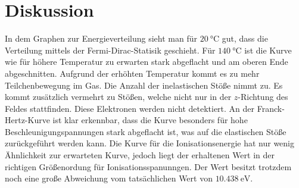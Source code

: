 \section{Diskussion}
\label{sec:Diskussion}
In dem Graphen zur Energieverteilung sieht man für $\SI{20}{\degreeCelsius}$ gut, dass die Verteilung mittels der Fermi-Dirac-Statisik geschieht.
Für $\SI{140}{\degreeCelsius}$ ist die Kurve wie für höhere Temperatur zu erwarten stark abgeflacht und am oberen Ende abgeschnitten.
Aufgrund der erhöhten Temperatur kommt es zu mehr Teilchenbewegung im Gas.
Die Anzahl der inelastischen Stöße nimmt zu.
Es kommt zusätzlich vermehrt zu Stößen, welche nicht nur in der $z$-Richtung des Feldes stattfinden.
Diese Elektronen werden nicht detektiert.
An der Franck-Hertz-Kurve ist klar erkennbar, dass die Kurve besonders für hohe Beschleunigungspannungen stark abgeflacht ist, was auf die elastischen Stöße zurückgeführt werden kann.
Die Kurve für die Ionisationsenergie hat nur wenig Ähnlichkeit zur erwarteten Kurve, jedoch liegt der erhaltenen Wert in der richtigen Größenordung für Ionisationsspanunngen.
Der Wert besitzt trotzdem noch eine große Abweichung vom tatsächlichen Wert von $\SI{10.438}{\electronvolt}$\cite{hg}.
